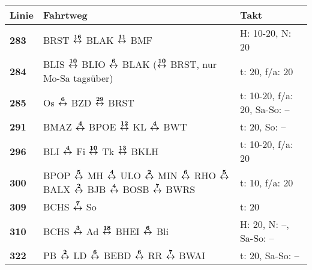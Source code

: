 \begin{minipage}[t]{0.05\textwidth}
\phantom{Tor}
\end{minipage}
\begin{minipage}[t]{0.45\textwidth}
\begin{tabular}{>{\bfseries}L{1.2cm}L{9.0cm}L{3.0cm}}
{\bfseries Linie} & {\bfseries Fahrtweg} & {\bfseries Takt} \\
\hline
\bus{} 283    & BRST $\boldsymbol{\overset{16}{\leftrightarrow}}$ BLAK $\boldsymbol{\overset{11}{\leftrightarrow}}$ BMF                                                                                                                             & H: 10-20, N: 20            \\
\bus{} 284    & BLIS $\boldsymbol{\overset{10}{\leftrightarrow}}$ BLIO $\boldsymbol{\overset{6}{\leftrightarrow}}$ BLAK ($\boldsymbol{\overset{10}{\leftrightarrow}}$ BRST, nur Mo-Sa tagsüber)                                                                                     & t: 20, f/a: 20             \\
\bus{} 285    & Os $\boldsymbol{\overset{6}{\leftrightarrow}}$ BZD $\boldsymbol{\overset{29}{\leftrightarrow}}$ BRST                                                                                                                                & t: 10-20, f/a: 20, Sa-So: -- \\
\bus{} 291    & BMAZ $\boldsymbol{\overset{4}{\leftrightarrow}}$ BPOE $\boldsymbol{\overset{12}{\leftrightarrow}}$ KL $\boldsymbol{\overset{4}{\leftrightarrow}}$ BWT                                                                                                               & t: 20, So: --              \\
\bus{} 296    & BLI $\boldsymbol{\overset{4}{\leftrightarrow}}$ Fi $\boldsymbol{\overset{10}{\leftrightarrow}}$ Tk $\boldsymbol{\overset{13}{\leftrightarrow}}$ BKLH                                                                                                                & t: 10-20, f/a: 20          \\
\bus{} 300    & BPOP $\boldsymbol{\overset{5}{\leftrightarrow}}$ MH $\boldsymbol{\overset{4}{\leftrightarrow}}$ ULO $\boldsymbol{\overset{2}{\leftrightarrow}}$ MIN $\boldsymbol{\overset{6}{\leftrightarrow}}$ RHO $\boldsymbol{\overset{5}{\leftrightarrow}}$ BALX $\boldsymbol{\overset{2}{\leftrightarrow}}$ BJB $\boldsymbol{\overset{4}{\leftrightarrow}}$ BOSB $\boldsymbol{\overset{7}{\leftrightarrow}}$ BWRS                              & t: 10, f/a: 20             \\
\bus{} 309    & BCHS $\boldsymbol{\overset{7}{\leftrightarrow}}$ So                                                                                                                                                 & t: 20                      \\
\bus{} 310    & BCHS $\boldsymbol{\overset{3}{\leftrightarrow}}$ Ad $\boldsymbol{\overset{18}{\leftrightarrow}}$ BHEI $\boldsymbol{\overset{6}{\leftrightarrow}}$ Bli                                                                                                               & H: 20, N: --, Sa-So: --    \\
\bus{} 322    & PB $\boldsymbol{\overset{2}{\leftrightarrow}}$ LD $\boldsymbol{\overset{6}{\leftrightarrow}}$ BEBD $\boldsymbol{\overset{6}{\leftrightarrow}}$ RR $\boldsymbol{\overset{7}{\leftrightarrow}}$ BWAI                                                                                                  & t: 20, Sa-So: --           \\

\end{tabular}
\end{minipage}

